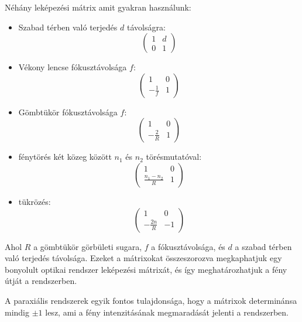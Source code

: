 \documentclass[../main.tex]{subfiles}
\begin{document}
Néhány leképezési mátrix amit gyakran használunk:
\begin{itemize}
    \item Szabad térben való terjedés $d$ távolságra:
    \begin{equation}
        \begin{pmatrix}
            1 & d \\
            0 & 1
        \end{pmatrix}
    \end{equation}
    \item Vékony lencse fókusztávolsága $f$:
    \begin{equation}
        \begin{pmatrix}
            1 & 0 \\
            -\frac{1}{f} & 1
        \end{pmatrix}
    \end{equation}
    \item Gömbtükör fókusztávolsága $f$:
    \begin{equation}
        \begin{pmatrix}
            1 & 0 \\
            -\frac{2}{R} & 1
        \end{pmatrix}
    \end{equation}
    \item fénytörés két közeg között $n_1$ és $n_2$ törésmutatóval:
    \begin{equation}
        \begin{pmatrix}
            1 & 0 \\
            \frac{n_1 - n_2}{R} & 1
        \end{pmatrix}
    \end{equation}
    \item tükrözés:
    \begin{equation}
        \begin{pmatrix}
            1 & 0 \\
            -\frac{2n}{R} & -1
        \end{pmatrix}
    \end{equation}
\end{itemize}
Ahol $R$ a gömbtükör görbületi sugara, $f$ a fókusztávolsága, és $d$ a szabad térben való terjedés távolsága. Ezeket a mátrixokat összeszorozva megkaphatjuk egy bonyolult optikai rendszer
leképezési mátrixát, és így meghatározhatjuk a fény útját a rendszerben.

A paraxiális rendszerek egyik fontos tulajdonsága, hogy a mátrixok determinánsa mindig $\pm 1$ lesz, ami a fény intenzitásának megmaradását jelenti a rendszerben.
\end{document}
